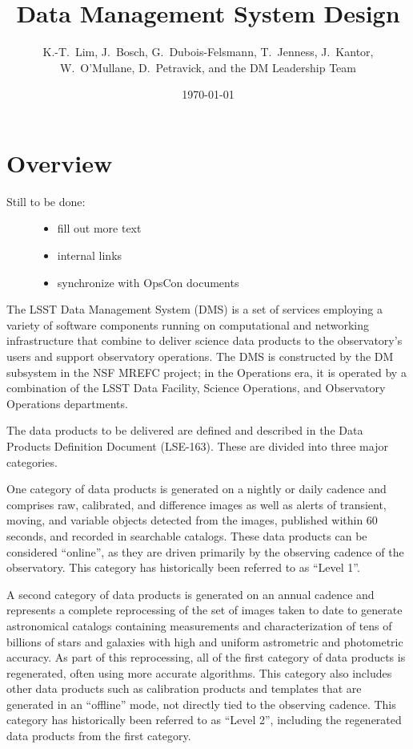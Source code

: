 \documentclass[DM,lsstdraft,toc]{lsstdoc}
\title{Data Management System Design}
\author{
  K.-T.~Lim,
  J.~Bosch,
  G.~Dubois-Felsmann,
  T.~Jenness,
  J.~Kantor,
  W.~O'Mullane,
  D.~Petravick,
  and
  the DM Leadership Team}
\date{\today}
\begin{document}
\maketitle

\section{Overview}\label{overview}

\begin{description}
\item[Still to be done:]
\begin{itemize}
\tightlist
\item
  fill out more text
\item
  internal links
\item
  synchronize with OpsCon documents
\end{itemize}
\end{description}

The LSST Data Management System (DMS) is a set of services employing a
variety of software components running on computational and networking
infrastructure that combine to deliver science data products to the
observatory's users and support observatory operations. The DMS is
constructed by the DM subsystem in the NSF MREFC project; in the
Operations era, it is operated by a combination of the LSST Data
Facility, Science Operations, and Observatory Operations departments.

The data products to be delivered are defined and described in the Data
Products Definition Document (LSE-163). These are divided into three
major categories.

One category of data products is generated on a nightly or daily cadence
and comprises raw, calibrated, and difference images as well as alerts
of transient, moving, and variable objects detected from the images,
published within 60 seconds, and recorded in searchable catalogs. These
data products can be considered ``online'', as they are driven primarily
by the observing cadence of the observatory. This category has
historically been referred to as ``Level 1''.

A second category of data products is generated on an annual cadence and
represents a complete reprocessing of the set of images taken to date to
generate astronomical catalogs containing measurements and
characterization of tens of billions of stars and galaxies with high and
uniform astrometric and photometric accuracy. As part of this
reprocessing, all of the first category of data products is regenerated,
often using more accurate algorithms. This category also includes other
data products such as calibration products and templates that are
generated in an ``offline'' mode, not directly tied to the observing
cadence. This category has historically been referred to as ``Level 2'',
including the regenerated data products from the first category.
\end{document}
